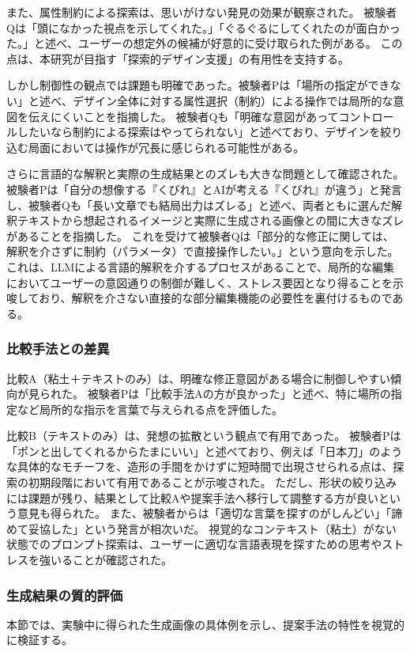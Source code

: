 \documentclass{kuisthesis}
\begin{document}
また、属性制約による探索は、思いがけない発見の効果が観察された。
被験者Qは「頭になかった視点を示してくれた。」「ぐるぐるにしてくれたのが面白かった。」と述べ、ユーザーの想定外の候補が好意的に受け取られた例がある。
この点は、本研究が目指す「探索的デザイン支援」の有用性を支持する。

しかし制御性の観点では課題も明確であった。被験者Pは「場所の指定ができない」と述べ、デザイン全体に対する属性選択（制約）による操作では局所的な意図を伝えにくいことを指摘した。
被験者Qも「明確な意図があってコントロールしたいなら制約による探索はやってられない」と述べており、デザインを絞り込む局面においては操作が冗長に感じられる可能性がある。

さらに言語的な解釈と実際の生成結果とのズレも大きな問題として確認された。
被験者Pは「自分の想像する『くびれ』とAIが考える『くびれ』が違う」と発言し、被験者Qも「長い文章でも結局出力はズレる」と述べ、両者ともに選んだ解釈テキストから想起されるイメージと実際に生成される画像との間に大きなズレがあることを指摘した。
これを受けて被験者Qは「部分的な修正に関しては、解釈を介さずに制約（パラメータ）で直接操作したい。」という意向を示した。
これは、LLMによる言語的解釈を介するプロセスがあることで、局所的な編集においてユーザーの意図通りの制御が難しく、ストレス要因となり得ることを示唆しており、解釈を介さない直接的な部分編集機能の必要性を裏付けるものである。

\subsubsection{比較手法との差異}
比較A（粘土＋テキストのみ）は、明確な修正意図がある場合に制御しやすい傾向が見られた。
被験者Pは「比較手法Aの方が良かった」と述べ、特に場所の指定など局所的な指示を言葉で与えられる点を評価した。

比較B（テキストのみ）は、発想の拡散という観点で有用であった。
被験者Pは「ポンと出してくれるからたまにいい」と述べており、例えば「日本刀」のような具体的なモチーフを、造形の手間をかけずに短時間で出現させられる点は、探索の初期段階において有用であることが示唆された。
ただし、形状の絞り込みには課題が残り、結果として比較Aや提案手法へ移行して調整する方が良いという意見も得られた。
また、被験者からは「適切な言葉を探すのがしんどい」「諦めて妥協した」という発言が相次いだ。
視覚的なコンテキスト（粘土）がない状態でのプロンプト探索は、ユーザーに適切な言語表現を探すための思考やストレスを強いることが確認された。

\subsubsection{生成結果の質的評価}
本節では、実験中に得られた生成画像の具体例を示し、提案手法の特性を視覚的に検証する。
\end{document}
